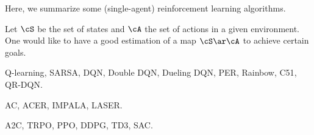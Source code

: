 \documentclass[article, a4paper, twoside]{universal}
\begin{document}
\confighead{}{}{}



Here, we summarize some (single-agent) reinforcement learning algorithms.


\begin{stp}
    Let $\cS$ be the set of states and $\cA$ the set of actions in a given environment. One would like to have a good estimation of a map $\cS\ar\cA$ to achieve certain goals.
\end{stp}



\TODO Q-learning\cite{Q-learning1992}, SARSA, DQN\cite{DQN2013}, Double DQN\cite{DoubleDQN2016}, Dueling DQN\cite{DuelingDQN2016}, PER\cite{PER2016}, Rainbow\cite{Rainbow2018}, C51\cite{C512017}, QR-DQN\cite{QR-DQN2018}.



\TODO AC\cite{AC1999}, ACER\cite{ACER2017}, IMPALA\cite{IMPALA2018}, LASER\cite{LASER2020}.

\TODO A2C\cite{A2C2016}, TRPO\cite{TRPO2015}, PPO\cite{PPO2017}, DDPG\cite{DDPG2016}, TD3\cite{TD32018}, SAC\cite{SAC2018}.




\printref
\end{document}
